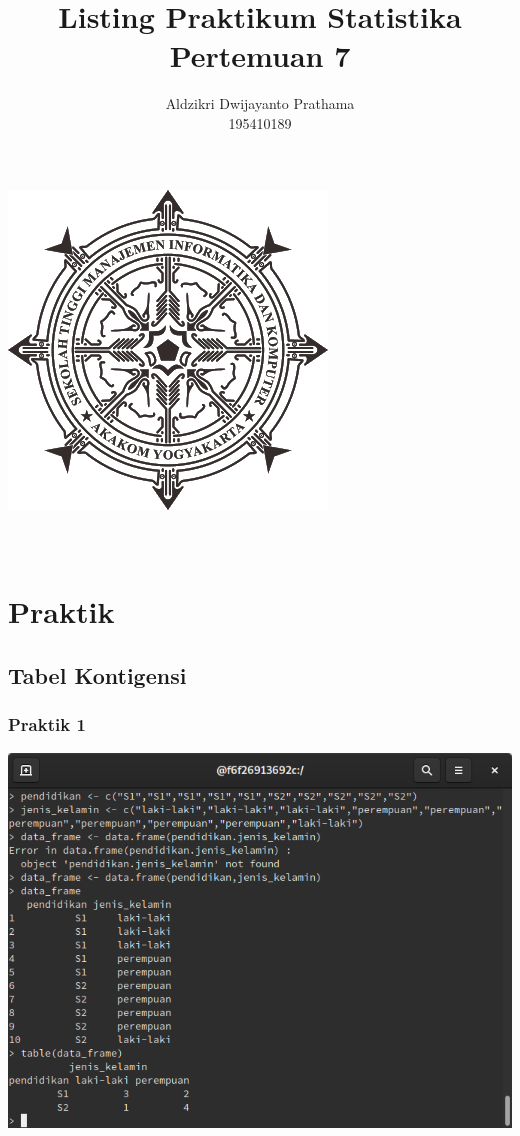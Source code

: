 \documentclass[a4paper,12pt]{article}
\begin{document}
\title{Listing Praktikum Statistika Pertemuan 7}
\author{Aldzikri Dwijayanto Prathama 
	\\195410189}
\makeatletter
\begin{titlepage}
\begin{center}
\includegraphics[scale=.8]{logo}\\[4ex]
{\huge \bfseries \@title }\\[2ex]
{\large \@author}\\[50ex]
\end{center}
\end{titlepage}
\makeatother
\newpage
\section{Praktik}
\subsection{Tabel Kontigensi}
\subsubsection{Praktik 1}
\includegraphics[width=\linewidth]{1}
\end{document}
